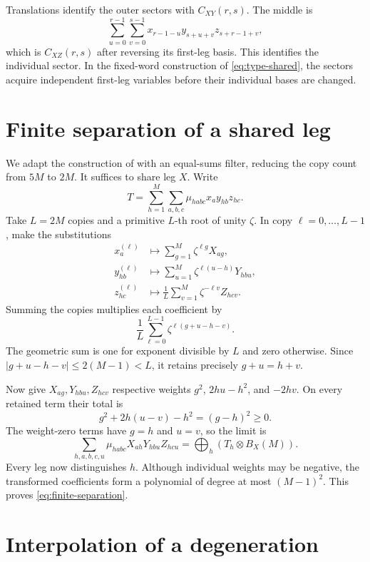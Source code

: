 \documentclass[11pt]{article}
\begin{document}
Translations identify the outer sectors with $C_{XY}(r,s)$. The middle is
\[
 \sum_{u=0}^{r-1}\sum_{v=0}^{s-1}
 x_{r-1-u}y_{s+u+v}z_{s+r-1+v},
\]
which is $C_{XZ}(r,s)$ after reversing its first-leg basis. This
identifies the individual sector. In the fixed-word construction of
\eqref{eq:type-shared}, the sectors acquire independent first-leg
variables before their individual bases are changed.

\section{Finite separation of a shared leg}\label{app:finite-separation}

We adapt the construction of \cite[Proposition~3.1]{openai-2026-matrix-nine-fourths}
with an equal-sums filter, reducing the copy count from $5M$ to $2M$.
It suffices to share leg $X$. Write
\[
 T=\sum_{h=1}^M\sum_{a,b,c}\mu_{habc}x_a y_{hb}z_{hc}.
\]
Take $L=2M$ copies and a primitive $L$-th root of unity $\zeta$.
In copy $\ell=0,\ldots,L-1$, make the substitutions
\[
\begin{aligned}
 x_a^{(\ell)}&\longmapsto\sum_{g=1}^M\zeta^{\ell g}X_{ag},\\
 y_{hb}^{(\ell)}&\longmapsto\sum_{u=1}^M\zeta^{\ell(u-h)}Y_{hbu},\\
 z_{hc}^{(\ell)}&\longmapsto\frac1L\sum_{v=1}^M
                        \zeta^{-\ell v}Z_{hcv}.
\end{aligned}
\]
Summing the copies multiplies each coefficient by
\[
 \frac1L\sum_{\ell=0}^{L-1}\zeta^{\ell(g+u-h-v)}.
\]
The geometric sum is one for exponent divisible by $L$ and zero
otherwise. Since $|g+u-h-v|\le2(M-1)<L$, it retains precisely
$g+u=h+v$.

Now give $X_{ag},Y_{hbu},Z_{hcv}$ respective weights
$g^2$, $2hu-h^2$, and $-2hv$. On every retained term their total is
\[
 g^2+2h(u-v)-h^2=(g-h)^2\ge0.
\]
The weight-zero terms have $g=h$ and $u=v$, so the limit is
\[
 \sum_{h,a,b,c,u}\mu_{habc}X_{ah}Y_{hbu}Z_{hcu}
 =\bigoplus_h(T_h\otimes B_X(M)).
\]
Every leg now distinguishes $h$. Although individual weights may be
negative, the transformed coefficients form a polynomial of degree at
most $(M-1)^2$. This proves \eqref{eq:finite-separation}.

\section{Interpolation of a degeneration}\label{app:degeneration-interpolation}
\end{document}

